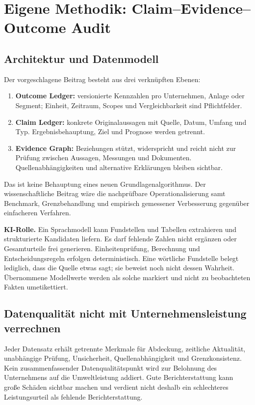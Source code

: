 \documentclass[11pt,a4paper]{article}
\begin{document}
\section{Eigene Methodik: Claim--Evidence--Outcome Audit}
\label{sec:design}
\subsection{Architektur und Datenmodell}
Der vorgeschlagene Beitrag besteht aus drei verknüpften Ebenen:
\begin{enumerate}
\item \textbf{Outcome Ledger:} versionierte Kennzahlen pro Unternehmen, Anlage oder Segment; Einheit, Zeitraum, Scopes und Vergleichbarkeit sind Pflichtfelder.
\item \textbf{Claim Ledger:} konkrete Originalaussagen mit Quelle, Datum, Umfang und Typ. Ergebnisbehauptung, Ziel und Prognose werden getrennt.
\item \textbf{Evidence Graph:} Beziehungen \glqq stützt\grqq, \glqq widerspricht\grqq{} und \glqq reicht nicht zur Prüfung\grqq{} zwischen Aussagen, Messungen und Dokumenten. Quellenabhängigkeiten und alternative Erklärungen bleiben sichtbar.
\end{enumerate}
Das ist keine Behauptung eines neuen Grundlagenalgorithmus. Der wissenschaftliche Beitrag wäre die nachprüfbare Operationalisierung samt Benchmark, Grenzbehandlung und empirisch gemessener Verbesserung gegenüber einfacheren Verfahren.

\textbf{KI-Rolle.} Ein Sprachmodell kann Fundstellen und Tabellen extrahieren und strukturierte Kandidaten liefern. Es darf fehlende Zahlen nicht ergänzen oder Gesamturteile frei generieren. Einheitenprüfung, Berechnung und Entscheidungsregeln erfolgen deterministisch. Eine wörtliche Fundstelle belegt lediglich, dass die Quelle etwas sagt; sie beweist noch nicht dessen Wahrheit. Übernommene Modellwerte werden als solche markiert und nicht zu beobachteten Fakten umetikettiert.

\subsection{Datenqualität nicht mit Unternehmensleistung verrechnen}
Jeder Datensatz erhält getrennte Merkmale für Abdeckung, zeitliche Aktualität, unabhängige Prüfung, Unsicherheit, Quellenabhängigkeit und Grenzkonsistenz. Kein zusammenfassender \glqq Datenqualitätspunkt\grqq{} wird zur Belohnung des Unternehmens auf die Umweltleistung addiert. Gute Berichterstattung kann große Schäden sichtbar machen und verdient nicht deshalb ein schlechteres Leistungsurteil als fehlende Berichterstattung.
\end{document}
